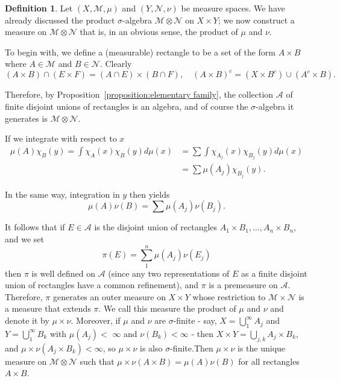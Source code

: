 \documentclass[12pt,a4paper]{book}
\theoremstyle{definition}
\newtheorem{defn}{Definition}[section]
\begin{document}
\begin{defn}
    Let $(X, \mathcal{M}, \mu)$ and $(Y, \mathcal{N}, \nu)$ be measure spaces. We have already discussed the product $\sigma$-algebra $\mathcal{M} \otimes \mathcal{N}$ on $X \times Y$; we now construct a measure on $\mathcal{M} \otimes \mathcal{N}$ that is, in an obvious sense, the product of $\mu$ and $\nu$.

    To begin with, we define a (measurable) rectangle to be a set of the form $A \times B$ where $A \in \mathcal{M}$ and $B \in \mathcal{N}$. Clearly
    $$
        (A \times B) \cap(E \times F)=(A \cap E) \times(B \cap F), \quad(A \times B)^c=\left(X \times B^c\right) \cup\left(A^c \times B\right) .
    $$

    Therefore, by Proposition~\ref{proposition:elementary family}, the collection $\mathcal{A}$ of finite disjoint unions of rectangles is an algebra, and of course the $\sigma$-algebra it generates is $\mathcal{M} \otimes \mathcal{N}$.

    If we integrate with respect to $x$
    $$
        \begin{aligned}
            \mu(A) \chi_B(y)=\int \chi_A(x) \chi_B(y) d \mu(x) & =\sum \int \chi_{A_j}(x) \chi_{B_j}(y) d \mu(x) \\
                                                               & =\sum \mu\left(A_j\right) \chi_{B_j}(y) .
        \end{aligned}
    $$

    In the same way, integration in $y$ then yields
    $$
        \mu(A) \nu(B)=\sum \mu\left(A_j\right) \nu\left(B_j\right) .
    $$

    It follows that if $E \in \mathcal{A}$ is the disjoint union of rectangles $A_1 \times B_1, \ldots, A_n \times B_n$, and we set
    $$
        \pi(E)=\sum_1^n \mu\left(A_j\right) \nu\left(E_j\right)
    $$
    then $\pi$ is well defined on $\mathcal{A}$ (since any two representations of $E$ as a finite disjoint union of
    rectangles have a common refinement), and $\pi$ is a premeasure on $\mathcal{A}$. Therefore,
    $\pi$ generates an outer measure on $X \times Y$ whose restriction to $\mathcal{M} \times \mathcal{N}$ is a
    measure that extends $\pi$. We call this measure the product of $\mu$ and $\nu$ and denote it by $\mu \times \nu$.
    Moreover, if $\mu$ and $\nu$ are $\sigma$-finite - say, $X=\bigcup_1^{\infty} A_j$ and $Y=\bigcup_1^{\infty} B_k$ with $\mu\left(A_j\right)<$ $\infty$ and $\nu\left(B_k\right)<\infty$ -
    then $X \times Y=\bigcup_{j, k} A_j \times B_k$, and $\mu \times \nu\left(A_j \times B_k\right)<\infty$,
    so $\mu \times \nu$ is also $\sigma$-finite.Then $\mu \times \nu$
    is the unique measure on $\mathcal{M} \otimes \mathcal{N}$ such that $\mu \times \nu(A \times B)=\mu(A) \nu(B)$ for all rectangles $A \times B$.


\end{defn}
\end{document}
